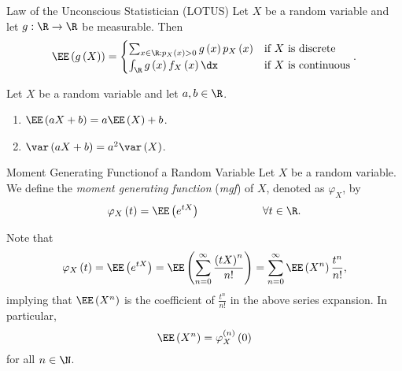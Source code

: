 \documentclass[stat333]{subfiles}
\begin{document}
    \begin{theorem}{Law of the Unconscious Statistician (LOTUS)}
        Let $X$ be a random variable and let $g:\R\to\R$ be measurable. Then
        \begin{equation*}
            \EE\left( g\left( X \right)  \right) =
            \begin{cases} 
                \sum^{}_{x\in\R:p_X\left( x \right) > 0} g\left( x \right) p_X\left( x \right) & \text{if }X\text{ is discrete}  \\
                \int^{}_{\R}g\left( x \right) f_X\left( x \right)  \dx & \text{if }X\text{ is continuous}
            \end{cases}.
        \end{equation*}
    \end{theorem}

    \begin{cor}{}
        Let $X$ be a random variable and let $a,b\in\R$.
        \begin{enumerate}
            \item $\EE\left( aX+b \right) = a\EE\left( X \right) + b$.
            \item $\var\left( aX+b \right) = a^{2} \var\left( X \right)$.
        \end{enumerate}
    \end{cor}

    \begin{definition}{Moment Generating Function}{of a Random Variable}
        Let $X$ be a random variable. We define the \emph{moment generating function} (\emph{mgf}) of $X$, denoted as $\varphi_X$, by
        \begin{equation*}
            \varphi_X\left( t \right) = \EE\left( e^{tX} \right) \hspace{2cm}\forall t\in\R.
        \end{equation*}
    \end{definition}

    \np Note that
    \begin{equation*}
        \varphi_X\left( t \right) = \EE\left( e^{tX} \right) = \EE\left( \sum^{\infty}_{n=0} \frac{\left( tX \right) ^n}{n!} \right) = \sum^{\infty}_{n=0} \EE\left( X^n \right) \frac{t^n}{n!},
    \end{equation*}
    implying that $\EE\left( X^n \right)$ is the coefficient of $\frac{t^n}{n!}$ in the above series expansion. In particular,
    \begin{equation*}
        \EE\left( X^n \right) = \varphi_X^{\left( n \right) }\left( 0 \right) 
    \end{equation*}
    for all $n\in\N$.
\end{document}
